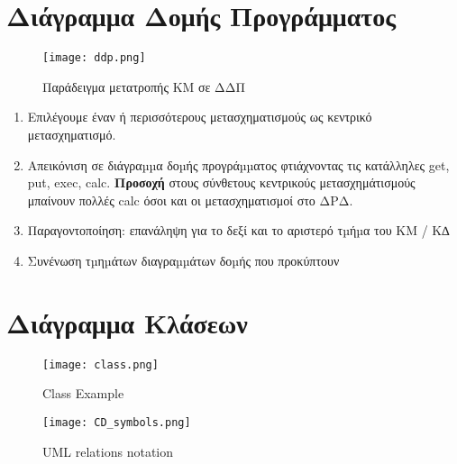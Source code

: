 \section{Διάγραμμα Δομής Προγράμματος}

\begin{figure}[Η]
	\centering
	\texttt{[image: ddp.png]}
	\caption{Παράδειγμα μετατροπής ΚΜ σε ΔΔΠ}
\end{figure}

\begin{enumerate}
	\item	Επιλέγουμε έναν ή περισσότερους μετασχηματισμούς ως κεντρικό μετασχηματισμό.
	\item	Απεικόνιση σε διάγραµµα δοµής προγράµµατος φτιάχνοντας τις κατάλληλες get, put, exec, calc.
		\textbf{Προσοχή} στους σύνθετους κεντρικούς μετασχημάτισμούς μπαίνουν πολλές calc όσοι και
		οι μετασχηματισμοί στο ΔΡΔ.
	\item	Παραγοντοποίηση: επανάληψη για το δεξί και το αριστερό τµήµα του ΚΜ / Κ∆
	\item	Συνένωση τµηµάτων διαγραµµάτων δοµής που προκύπτουν
\end{enumerate}


\section{Διάγραμμα Κλάσεων}

\begin{figure}[H]
	\centering
	\texttt{[image: class.png]}
	\caption{Class Example}
\end{figure}

\begin{figure}[H]
	\centering
	\texttt{[image: CD\_symbols.png]}
	\caption{UML relations notation}
\end{figure}

